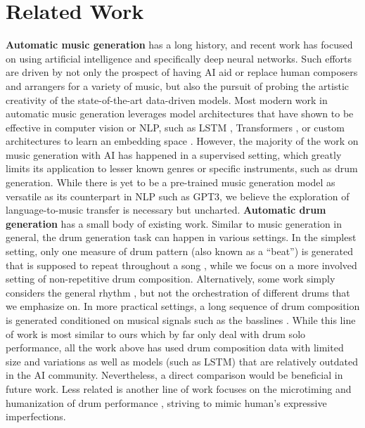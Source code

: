 \documentclass[letterpaper]{article} %
\begin{document}
\section{Related Work}

\textbf{Automatic music generation} has a long history, and recent work has focused on using artificial intelligence \cite{kaliakatsos2020artificial} and specifically deep neural networks. Such efforts are driven by not only the prospect of having AI aid or replace human composers and arrangers for a variety of music, but also the pursuit of probing the artistic creativity of the state-of-the-art data-driven models. Most modern work in automatic music generation leverages model architectures that have shown to be effective in computer vision or NLP, such as LSTM \cite{lyu2015modelling}, Transformers \citep{huang2018music,zeng2021musicbert,https://doi.org/10.48550/arxiv.2210.10349}, or custom architectures to learn an embedding space \cite{liang2020pirhdy}. However, the majority of the work on music generation with AI has happened in a supervised setting, which greatly limits its application to lesser known genres or specific instruments, such as drum generation. While there is yet to be a pre-trained music generation model as versatile as its counterpart in NLP such as GPT3, we believe the exploration of language-to-music transfer is necessary but uncharted.  \textbf{Automatic drum generation} has a small body of existing work. Similar to music generation in general, the drum generation task can happen in various settings. In the simplest setting, only one measure of drum pattern (also known as a ``beat'') is generated that is supposed to repeat throughout a song  \cite{vogl2017intelligent,bruford2020jaki,complexis21}, while we focus on a more involved setting of non-repetitive drum composition. Alternatively, some work simply considers the general rhythm \cite{lattner2019high}, but not the orchestration of different drums that we emphasize on. In more practical settings, a long sequence of drum composition is generated conditioned on musical signals such as the basslines \cite{makris2017combining,makris2019conditional}. While this line of work is most similar to ours which by far only deal with drum solo performance, all the work above has used drum composition data with limited size and variations as well as models (such as LSTM) that are relatively outdated in the AI community. Nevertheless, a direct comparison would be beneficial in future work. Less related is another line of work focuses on the microtiming and humanization of drum performance \cite{gillick2019learning,burloiu2020adaptive,burloiu2020interactive}, striving to mimic human's expressive imperfections.
\end{document}
